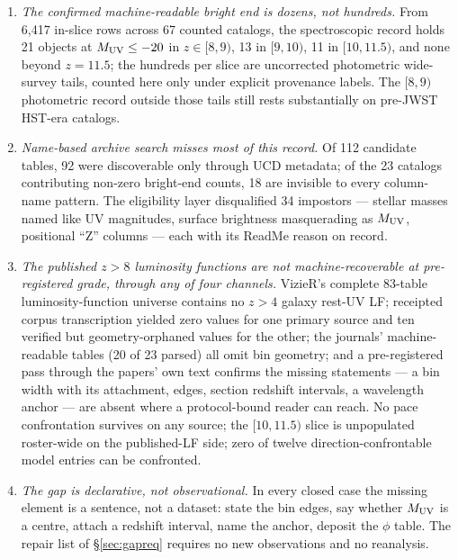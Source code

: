 \documentclass[twocolumn]{aastex702}
\begin{document}
\begin{enumerate}
\item \emph{The confirmed machine-readable bright end is dozens, not hundreds.} From
6{,}417 in-slice rows across 67 counted catalogs, the spectroscopic record holds 21
objects at $M_{\rm UV}\le-20$ in $z\in[8,9)$, 13 in $[9,10)$, 11 in $[10,11.5)$, and
none beyond $z=11.5$; the hundreds per slice are uncorrected photometric wide-survey
tails, counted here only under explicit provenance labels. The $[8,9)$ photometric
record outside those tails still rests substantially on pre-JWST HST-era catalogs.

\item \emph{Name-based archive search misses most of this record.} Of 112 candidate
tables, 92 were discoverable only through UCD metadata; of the 23 catalogs contributing
non-zero bright-end counts, 18 are invisible to every column-name pattern. The
eligibility layer disqualified 34 impostors --- stellar masses named like UV magnitudes,
surface brightness masquerading as $M_{\rm UV}$, positional ``Z'' columns --- each with
its ReadMe reason on record.

\item \emph{The published $z>8$ luminosity functions are not machine-recoverable at
pre-registered grade, through any of four channels.} VizieR's complete 83-table
luminosity-function universe contains no $z>4$ galaxy rest-UV LF; receipted corpus
transcription yielded zero values for one primary source and ten verified but
geometry-orphaned values for the other; the journals' machine-readable tables (20 of 23
parsed) all omit bin geometry; and a pre-registered pass through the papers' own text
confirms the missing statements --- a bin width with its attachment, edges, section
redshift intervals, a wavelength anchor --- are absent where a protocol-bound reader can
reach. No pace confrontation survives on any source; the $[10,11.5)$ slice is
unpopulated roster-wide on the published-LF side; zero of twelve direction-confrontable
model entries can be confronted.

\item \emph{The gap is declarative, not observational.} In every closed case the missing
element is a sentence, not a dataset: state the bin edges, say whether $M_{\rm UV}$ is a
centre, attach a redshift interval, name the anchor, deposit the $\phi$ table. The
repair list of \S\ref{sec:gapreq} requires no new observations and no reanalysis.
\end{enumerate}
\end{document}
